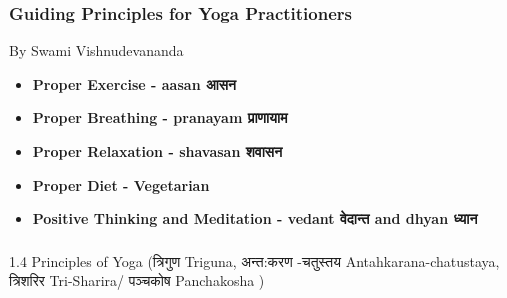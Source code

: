 \begin{frame}[fragile]\frametitle{Guiding Principles for Yoga Practitioners}

By Swami Vishnudevananda

    \begin{itemize}
        \item \textbf{Proper Exercise - aasan आसन}
            
            
        \item \textbf{Proper Breathing - pranayam प्राणायाम}
            
            
        \item \textbf{Proper Relaxation - shavasan  शवासन }
            
            
        \item \textbf{Proper Diet - Vegetarian}
            
            
        \item \textbf{Positive Thinking and Meditation - vedant  वेदान्त  and dhyan ध्यान }
            
            
    \end{itemize}
\end{frame}


\begin{frame}[fragile]\frametitle{}
\begin{center}
{\Large 1.4 Principles of Yoga (त्रिगुण Triguna, अन्त:करण -चतुस्तय Antahkarana-chatustaya, त्रिशरिर  Tri-Sharira/  पञ्चकोष Panchakosha )}
\end{center}
\end{frame}

